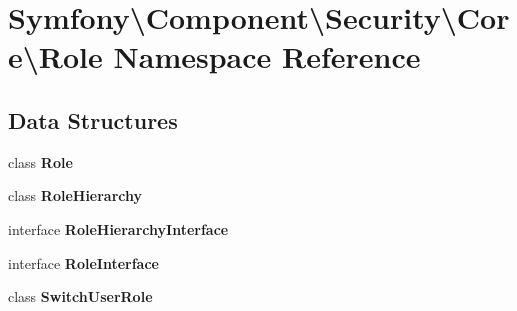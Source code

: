 \section{Symfony\textbackslash{}Component\textbackslash{}Security\textbackslash{}Core\textbackslash{}Role Namespace Reference}
\label{namespace_symfony_1_1_component_1_1_security_1_1_core_1_1_role}
\subsection*{Data Structures}
\begin{DoxyCompactItemize}
\item 
class {\bf Role}
\item 
class {\bf Role\+Hierarchy}
\item 
interface {\bf Role\+Hierarchy\+Interface}
\item 
interface {\bf Role\+Interface}
\item 
class {\bf Switch\+User\+Role}
\end{DoxyCompactItemize}
